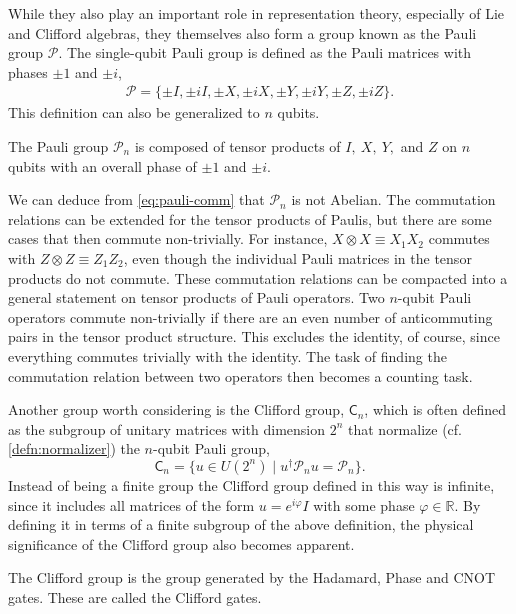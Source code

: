 While they also play
an important role in representation theory, especially of Lie and Clifford
algebras, they themselves also form a group known as the Pauli group
$\mathcal{P}$. The single-qubit Pauli group is defined as the Pauli matrices
with phases $\pm 1$ and $\pm i$,
\begin{align}
  \mathcal{P} = \{\pm I, \pm i I, \pm X, \pm i X, \pm Y, \pm i Y, \pm Z, \pm i
  Z \}
.\end{align}
This definition can also be generalized to $n$ qubits.
\begin{defn}\label{defn:pauligroup}
  The Pauli group $\mathcal{P}_n$ is composed of tensor products of $I,\ X,\
  Y,$ and $Z$ on $n$ qubits with an overall phase of $\pm 1$ and $\pm i$.
\end{defn}
We can deduce from \cref{eq:pauli-comm} that $\mathcal{P}_n$ is not Abelian.
The commutation relations can be extended for the tensor products of Paulis,
but there are some cases that then commute non-trivially. For instance,
$X \otimes X \equiv X_1X_2$ commutes with $Z\otimes Z\equiv Z_1Z_2$, even though the individual
Pauli matrices in the tensor products do not commute. These commutation
relations can be compacted into a general statement on tensor products of Pauli
operators. Two $n$-qubit Pauli operators commute non-trivially if there are an
even number of anticommuting pairs in the tensor product structure. This
excludes the identity, of course, since everything commutes trivially with the
identity. The task of finding the commutation relation between two operators
then becomes a counting task.

Another group worth considering is the Clifford group, $\mathsf{C}_n$, which is
often defined as the subgroup of unitary matrices with dimension $2^n$ that
normalize (cf. \cref{defn:normalizer}) the $n$-qubit Pauli group,
$$\mathsf{C}_n = \{ u \in U\left(2^n\right) \mid u^\dagger \mathcal{P}_n u
= \mathcal{P}_n \}.$$
Instead of being a finite group the Clifford group defined in this way is
infinite, since it includes all matrices of the form $u= e^{i\varphi} I$ with
some phase $\varphi \in \mathbb{R}$. By defining it in terms of a finite
subgroup of the above definition, the physical significance of the Clifford
group also becomes apparent.

\begin{defn}\label{defn:cliffords}
  The Clifford group is the group generated by the Hadamard, Phase and CNOT
  gates. These are called the Clifford gates. 
\end{defn}

